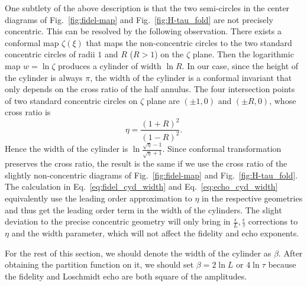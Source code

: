 One subtlety of the above description is that the two semi-circles in the center diagrams of Fig.~\ref{fig:fidel-map} and Fig.~\ref{fig:H-tau_fold} are not precisely concentric. This can be resolved by the following observation. There exists a conformal map $\zeta(\xi)$ that maps the non-concentric circles to the two standard concentric circles of radii $1$ and $R$ ($R>1$) on the $\zeta$ plane\cite{brown_complex_2009}. Then the logarithmic map $w = \ln \zeta$ produces a cylinder of width $\ln R$. In our case, since the height of the cylinder is always $\pi$, the width of the cylinder is a conformal invariant that only depends on the cross ratio of the half annulus. The four intersection points of two standard concentric circles on $\zeta$ plane are $(\pm 1,0)$ and $(\pm R,0)$, whose cross ratio is
\begin{equation}
\eta = \frac{(1 + R)^2}{(1 - R)^2}. 
\end{equation}
Hence the width of the cylinder is $\ln \frac{\sqrt{ \eta } - 1}{\sqrt{ \eta} + 1}$. Since conformal transformation preserves the cross ratio, the result is the same if we use the cross ratio of the slightly non-concentric diagrams of Fig.~\ref{fig:fidel-map} and Fig.~\ref{fig:H-tau_fold}. The calculation in Eq.~\eqref{eq:fidel_cyd_width} and Eq.~\eqref{eq:echo_cyd_width} equivalently use the leading order approximation to $\eta$ in the respective geometries and thus get the leading order term in the width of the cylinders. The slight deviation to the precise concentric geometry will only bring in $\frac{\epsilon}{L}, \frac{\epsilon}{\tau}$ corrections to $\eta$ and the width parameter, which will not affect the fidelity and echo exponents. 

For the rest of this section, we should denote the width of the cylinder as $\beta$. After obtaining the partition function on it, we should set $\beta = 2 \ln L$ or $ 4 \ln \tau$ because the fidelity and Loschmidt echo are both square of the amplitudes.

